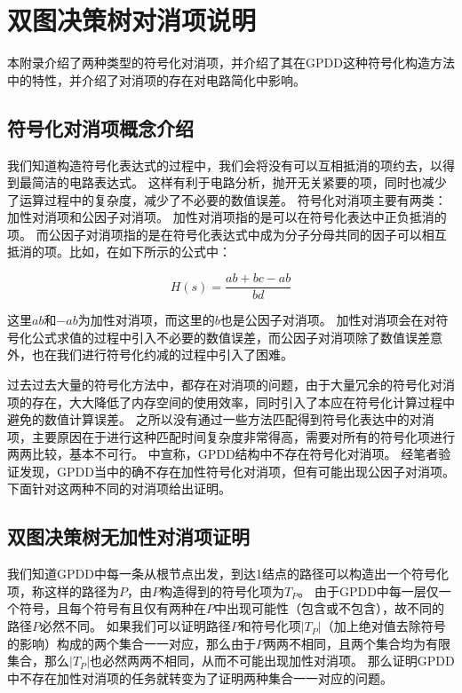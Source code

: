 \chapter{双图决策树对消项说明}
\label{app:cancel}

本附录介绍了两种类型的符号化对消项，并介绍了其在GPDD这种符号化构造方法中的特性，并介绍了对消项的存在对电路简化中影响。

\section{符号化对消项概念介绍}
\label{sec:cancel:intro}

我们知道构造符号化表达式的过程中，我们会将没有可以互相抵消的项约去，以得到最简洁的电路表达式。
这样有利于电路分析，抛开无关紧要的项，同时也减少了运算过程中的复杂度，减少了不必要的数值误差。
符号化对消项主要有两类：加性对消项和公因子对消项。
加性对消项指的是可以在符号化表达中正负抵消的项。
而公因子对消项指的是在符号化表达式中成为分子分母共同的因子可以相互抵消的项。比如，在如下所示的公式中：

\begin{equation}
H\left( s \right) = \frac{ab + bc - ab}{bd}
\end{equation}

这里$ab$和$-ab$为加性对消项，而这里的$b$也是公因子对消项。
加性对消项会在对符号化公式求值的过程中引入不必要的数值误差，而公因子对消项除了数值误差意外，也在我们进行符号化约减的过程中引入了困难。

过去过去大量的符号化方法中，都存在对消项的问题，由于大量冗余的符号化对消项的存在，大大降低了内存空间的使用效率，同时引入了本应在符号化计算过程中避免的数值计算误差。
之所以没有通过一些方法匹配得到符号化表达中的对消项，主要原因在于进行这种匹配时间复杂度非常得高，需要对所有的符号化项进行两两比较，基本不可行。
\parencite{GShi-GPDD-2013}中宣称，GPDD结构中不存在符号化对消项。
经笔者验证发现，GPDD当中的确不存在加性符号化对消项，但有可能出现公因子对消项。
下面针对这两种不同的对消项给出证明。

\section{双图决策树无加性对消项证明}
\label{sec:cancel:add}

我们知道GPDD中每一条从根节点出发，到达1结点的路径可以构造出一个符号化项，称这样的路径为$P$，由$P$构造得到的符号化项为$T_P$。
由于GPDD中每一层仅一个符号，且每个符号有且仅有两种在$P$中出现可能性（包含或不包含），故不同的路径$P$必然不同。
如果我们可以证明路径$P$和符号化项$\left|T_P\right|$（加上绝对值去除符号的影响）构成的两个集合一一对应，那么由于$P$两两不相同，且两个集合均为有限集合，那么$\left|T_P\right|$也必然两两不相同，从而不可能出现加性对消项。
那么证明GPDD中不存在加性对消项的任务就转变为了证明两种集合一一对应的问题。

